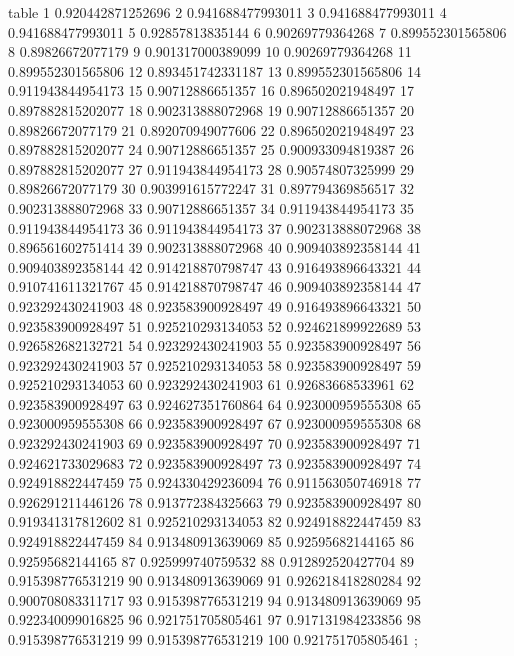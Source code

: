 \nextgroupplot[title=Seed 0,
height=\figheight,
legend cell align={left},
legend columns=-1,
legend style={
  fill opacity=0.8,
  draw opacity=1,
  text opacity=1,
  at={(-0.20,1.36)},%
  anchor=south west,
  draw=white!80!black
},
minor xtick={25, 75},
minor ytick={},
tick align=outside,
tick pos=left,
width=\figwidth,
x grid style={white!69.0196078431373!black},
xlabel={Eval. Steps},
xminorgrids,
xmajorgrids,
xmin=-3.95, xmax=104.95,
xtick style={color=black},
xtick={-25,0,50,100,125},
xticklabels={-25,0,50,100,125},
y grid style={white!69.0196078431373!black},
ylabel={ACC (\%)},
ymajorgrids,
ymin=0.874000021219254, ymax=0.944911737839381,
ytick style={color=black},
ytick={0.87,0.88,0.89,0.9,0.91,0.92,0.93,0.94,0.95},
yticklabels={87,88,89,90,91,92,93,94,95}
]
table {%
1 0.920442871252696
2 0.941688477993011
3 0.941688477993011
4 0.941688477993011
5 0.92857813835144
6 0.90269779364268
7 0.899552301565806
8 0.89826672077179
9 0.901317000389099
10 0.90269779364268
11 0.899552301565806
12 0.893451742331187
13 0.899552301565806
14 0.911943844954173
15 0.90712886651357
16 0.896502021948497
17 0.897882815202077
18 0.902313888072968
19 0.90712886651357
20 0.89826672077179
21 0.892070949077606
22 0.896502021948497
23 0.897882815202077
24 0.90712886651357
25 0.900933094819387
26 0.897882815202077
27 0.911943844954173
28 0.90574807325999
29 0.89826672077179
30 0.903991615772247
31 0.897794369856517
32 0.902313888072968
33 0.90712886651357
34 0.911943844954173
35 0.911943844954173
36 0.911943844954173
37 0.902313888072968
38 0.896561602751414
39 0.902313888072968
40 0.909403892358144
41 0.909403892358144
42 0.914218870798747
43 0.916493896643321
44 0.910741611321767
45 0.914218870798747
46 0.909403892358144
47 0.923292430241903
48 0.923583900928497
49 0.916493896643321
50 0.923583900928497
51 0.925210293134053
52 0.924621899922689
53 0.926582682132721
54 0.923292430241903
55 0.923583900928497
56 0.923292430241903
57 0.925210293134053
58 0.923583900928497
59 0.925210293134053
60 0.923292430241903
61 0.92683668533961
62 0.923583900928497
63 0.924627351760864
64 0.923000959555308
65 0.923000959555308
66 0.923583900928497
67 0.923000959555308
68 0.923292430241903
69 0.923583900928497
70 0.923583900928497
71 0.924621733029683
72 0.923583900928497
73 0.923583900928497
74 0.924918822447459
75 0.924330429236094
76 0.911563050746918
77 0.926291211446126
78 0.913772384325663
79 0.923583900928497
80 0.919341317812602
81 0.925210293134053
82 0.924918822447459
83 0.924918822447459
84 0.913480913639069
85 0.92595682144165
86 0.92595682144165
87 0.925999740759532
88 0.912892520427704
89 0.915398776531219
90 0.913480913639069
91 0.926218418280284
92 0.900708083311717
93 0.915398776531219
94 0.913480913639069
95 0.922340099016825
96 0.921751705805461
97 0.917131984233856
98 0.915398776531219
99 0.915398776531219
100 0.921751705805461
};
